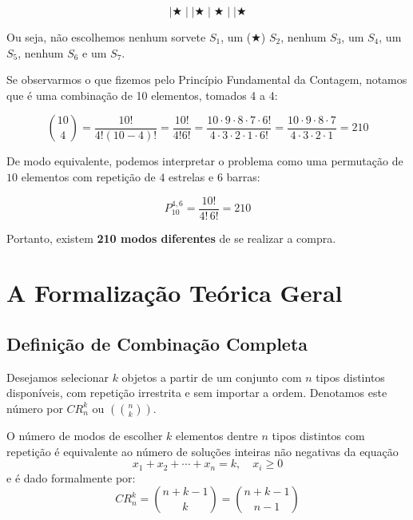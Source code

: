 \documentclass[12pt,a4paper]{report}
\begin{document}
\begin{destaque}
		$$ \mid \bigstar \mid \mid \bigstar \mid \bigstar \mid \mid \bigstar$$
		
		Ou seja, não escolhemos nenhum sorvete $S_1$, um ($\bigstar$) $S_2$, nenhum $S_3$, um $S_4$, um $S_5$, nenhum $S_6$ e um $S_7$.
		
	\end{destaque}
	
	\newpage
	
	\begin{destaque}
		\label{dest:calculo_combinacao}
		Se observarmos o que fizemos pelo Princípio Fundamental da Contagem, notamos que é uma combinação de 10 elementos, tomados 4 a 4:
		
		$$\binom{10}{4} = \frac{10!}{4!(10-4)!} = \frac{10!}{4!6!} = \frac{10 \cdot 9 \cdot 8 \cdot 7 \cdot 6!}{4 \cdot 3 \cdot 2 \cdot 1 \cdot 6!} = \frac{10 \cdot 9 \cdot 8 \cdot 7}{4 \cdot 3 \cdot 2 \cdot 1} = 210$$
	\end{destaque}
	
	De modo equivalente, podemos interpretar o problema como uma permutação de $10$ elementos com repetição de $4$ estrelas e $6$ barras:
	\begin{destaque}
		$$P_{10}^{4, 6} = \frac{10!}{4! \, 6!} = 210$$
	\end{destaque}
	
	Portanto, existem \textbf{210 modos diferentes} de se realizar a compra.
	
	\chapter{A Formalização Teórica Geral}
	\label{cap:formalizacao}
	
	\section{Definição de Combinação Completa}
	
	Desejamos selecionar $k$ objetos a partir de um conjunto com $n$ tipos distintos disponíveis, com repetição irrestrita e sem importar a ordem. Denotamos este número por $CR_n^k$ ou $\left(\!\binom{n}{k}\!\right)$.
	
	\begin{destaque}
		\label{dest:teorema_geral}
		O número de modos de escolher $k$ elementos dentre $n$ tipos distintos com repetição é equivalente ao número de soluções inteiras não negativas da equação
		$$x_1 + x_2 + \cdots + x_n = k, \quad x_i \geqslant 0$$
		e é dado formalmente por:
		$$CR_n^k = \binom{n + k - 1}{k} = \binom{n + k - 1}{n - 1}$$
	\end{destaque}
	
\end{document}
